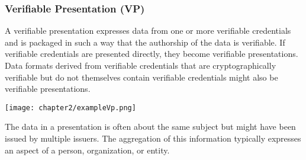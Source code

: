 \subsubsection{Verifiable Presentation (VP)}
A verifiable presentation\cite{site:w3cvc} expresses data from one or more verifiable credentials and is 
packaged in such a way that the authorship of the data is verifiable. If verifiable 
credentials are presented directly, they become verifiable presentations. Data formats 
derived from verifiable credentials that are cryptographically verifiable but do not 
themselves contain verifiable credentials might also be verifiable presentations.
\begin{center}
    \texttt{[image: chapter2/exampleVp.png]}
\end{center}
The data in a presentation is often about the same subject but might have been issued by 
multiple issuers. The aggregation of this information typically expresses an aspect of 
a person, organization, or entity.

